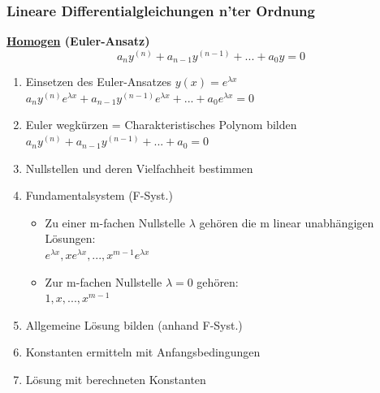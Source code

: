\documentclass[6pt]{article}
\begin{document}
\begin{multicols*}{3}
	\vfill\eject
	
	\subsubsection*{Lineare Differentialgleichungen n'ter Ordnung}
	
	
	{\bf \underline{Homogen} (Euler-Ansatz)}  \\
		
		\[a_{n}y^{(n)} + a_{n-1}y^{(n-1)} + ... + a_{0}y = 0\]
		
		\begin{enumerate}[label=(\roman*), itemsep=2pt, parsep=3pt ]
			\item 	Einsetzen des Euler-Ansatzes $y(x) = e^{\lambda x}$ \\
						$a_{n}y^{(n)}e^{\lambda x} + a_{n-1}y^{(n-1)}e^{\lambda x} + ... + a_{0}e^{\lambda x} = 0$
			\item 	Euler wegk{\"u}rzen = Charakteristisches Polynom bilden	\\
						$a_{n}y^{(n)} + a_{n-1}y^{(n-1)} + ... + a_{0} = 0$	
			\item 	Nullstellen und deren Vielfachheit bestimmen
			\item 	Fundamentalsystem (F-Syst.)
						\begin{itemize}[itemsep=2pt, parsep=3pt ]
								\item Zu einer m-fachen Nullstelle $\lambda$ geh{\"o}ren die m linear unabh{\"a}ngigen L{\"o}sungen: \\
									$e^{\lambda x}, x e^{\lambda x}, ... ,x^{m-1} e^{\lambda x}$
								\item Zur m-fachen Nullstelle $\lambda = 0$ geh{\"o}ren: \\
											$1, x, ..., x^{m-1}$
						\end{itemize}
			\item 	Allgemeine L{\"o}sung bilden (anhand F-Syst.)
			\item 	Konstanten ermitteln mit Anfangsbedingungen
			\item 	L{\"o}sung mit berechneten Konstanten
		\end{enumerate}	
	

\end{multicols*}
\end{document}
